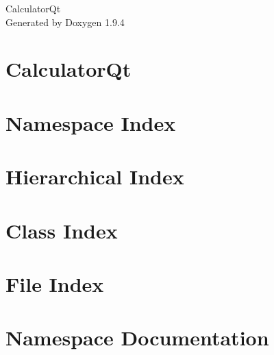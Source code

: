\documentclass[twoside]{book}
\newcommand{\+}{\discretionary{\mbox{\scriptsize$\hookleftarrow$}}{}{}}
\newcommand{\clearemptydoublepage}{%
    \newpage{\pagestyle{empty}\cleardoublepage}%
  }
\begin{document}
  \raggedbottom
    \hypersetup{pageanchor=false,
                bookmarksnumbered=true,
                pdfencoding=unicode
               }
  \begin{titlepage}
  \vspace*{7cm}
  \begin{center}%
  {\Large Calculator\+Qt}\\
  \vspace*{1cm}
  {\large Generated by Doxygen 1.9.4}\\
  \end{center}
  \end{titlepage}
  \clearemptydoublepage
  \tableofcontents
  \clearemptydoublepage
  \hypersetup{pageanchor=true}
\chapter{Calculator\+Qt}
\label{md__r_e_a_d_m_e}

\chapter{Namespace Index}

\chapter{Hierarchical Index}

\chapter{Class Index}

\chapter{File Index}

\chapter{Namespace Documentation}


\end{document}
